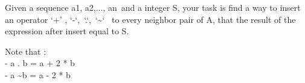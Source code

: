 Given a sequence a1, a2,..., an and a integer S, your task is find a way to insert an operator ‘+’ , ‘-‘, ‘.‘, ‘\textasciitilde‘  to every neighbor pair of A, that the result of the expression after insert equal to S.

Note that :
\\- a . b = a + 2 * b
\\- a \textasciitilde b = a - 2 * b